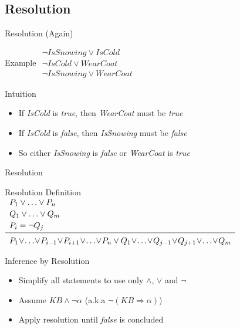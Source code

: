 \documentclass[14pt]{beamer}
\newcommand{\limpl}{\Rightarrow}
\begin{document}
\subsection{Resolution}

\begin{frame}{Resolution (Again)}
	\begin{block}{Example}
		$
		\begin{array}{l}
		\lnot \textit{IsSnowing} \lor \textit{IsCold} \\
		\lnot \textit{IsCold} \lor \textit{WearCoat} \\
		\hline
		\lnot \textit{IsSnowing} \lor \textit{WearCoat}
		\end{array}
		$
	\end{block}
	\begin{block}{Intuition}
		\begin{itemize}
			\item If \textit{IsCold} is \emph{true}, then \textit{WearCoat} must be \emph{true}
			\item If \textit{IsCold} is \emph{false}, then \textit{IsSnowing} must be \emph{false}
			\item So either \textit{IsSnowing} is \emph{false} or \textit{WearCoat} is \emph{true}
		\end{itemize}
	\end{block}
\end{frame}
\begin{frame}{Resolution}
	\begin{block}{Resolution Definition}
	\small
	$
	\begin{array}{l}
		P_1 \lor \ldots \lor P_n \\[.2em]
		Q_1 \lor \ldots \lor Q_m \\[.2em]
		P_i = \lnot Q_j \\[.2em]
		\hline
		\\[-.8em]
		P_1 \!\lor\! \ldots \!\lor\! P_{i-1} \!\lor\! P_{i+1} \!\lor\! \ldots \!\lor\! P_n
		\lor
		Q_1 \!\lor\! \ldots \!\lor\! Q_{j-1} \!\lor\! Q_{j+1} \!\lor\! \ldots \!\lor\! Q_m
	\end{array}
	$
	\end{block}
	\begin{block}{Inference by Resolution}
		\begin{itemize}
			\item Simplify all statements to use only $\land$, $\lor$ and $\lnot$
			\item Assume $\textit{KB} \land \lnot\alpha$ (a.k.a $\lnot (\textit{KB} \limpl \alpha)$)
			\item Apply resolution until \emph{false} is concluded
		\end{itemize}
	\end{block}
\end{frame}
\end{document}
